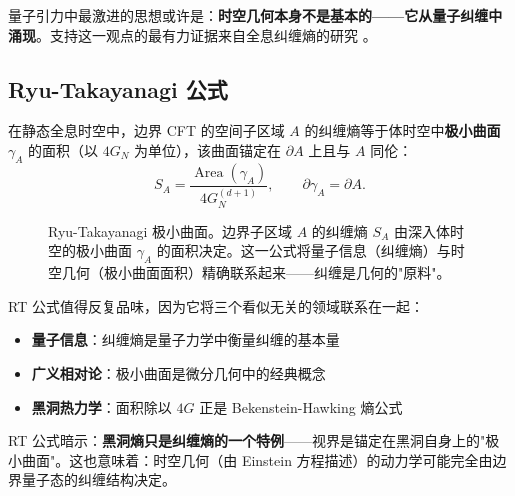 量子引力中最激进的思想或许是：\textbf{时空几何本身不是基本的——它从量子纠缠中涌现}。支持这一观点的最有力证据来自全息纠缠熵的研究 \cite{Rangamani2016}。

\subsection{Ryu-Takayanagi 公式}

\begin{theorem}
    在静态全息时空中，边界 CFT 的空间子区域 $A$ 的纠缠熵等于体时空中\textbf{极小曲面} $\gamma_A$ 的面积（以 $4G_N$ 为单位），该曲面锚定在 $\partial A$ 上且与 $A$ 同伦：
    \begin{equation}
        \boxed{S_A = \frac{\operatorname{Area}(\gamma_A)}{4G_N^{(d+1)}}}, \qquad \partial\gamma_A = \partial A.
    \end{equation}
\end{theorem}

\begin{figure}[htbp]
\centering
{}
\caption{Ryu-Takayanagi 极小曲面。边界子区域 $A$ 的纠缠熵 $S_A$ 由深入体时空的极小曲面 $\gamma_A$ 的面积决定。这一公式将量子信息（纠缠熵）与时空几何（极小曲面面积）精确联系起来——纠缠是几何的"原料"。}
\label{fig:RT_surface}
\end{figure}

\begin{remark}[RT 公式的革命性意义]
    RT 公式值得反复品味，因为它将三个看似无关的领域联系在一起：
    \begin{itemize}
        \item \textbf{量子信息}：纠缠熵是量子力学中衡量纠缠的基本量
        \item \textbf{广义相对论}：极小曲面是微分几何中的经典概念
        \item \textbf{黑洞热力学}：面积除以 $4G$ 正是 Bekenstein-Hawking 熵公式
    \end{itemize}
    RT 公式暗示：\textbf{黑洞熵只是纠缠熵的一个特例}——视界是锚定在黑洞自身上的"极小曲面"。这也意味着：时空几何（由 Einstein 方程描述）的动力学可能完全由边界量子态的纠缠结构决定。
\end{remark}

